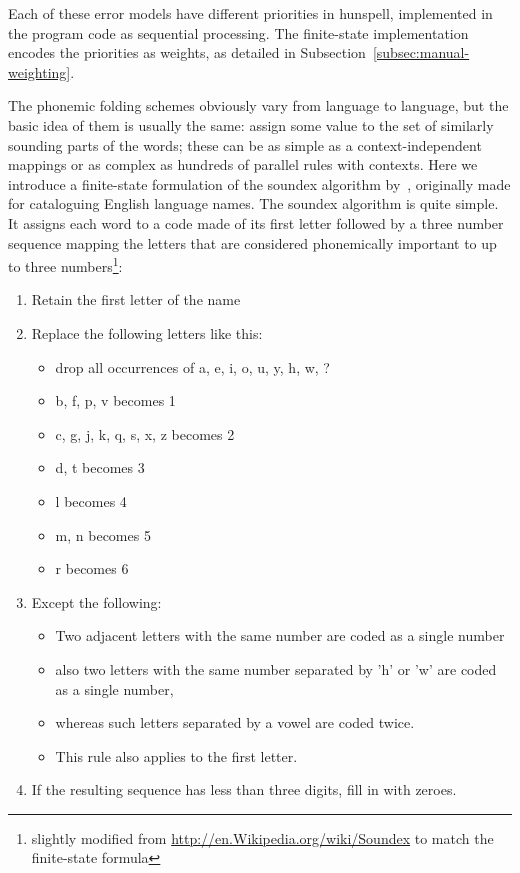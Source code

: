 \documentclass[a4paper,12pt]{article}
\begin{document}
Each of these error models have different priorities in hunspell, implemented
in the program code as sequential processing. The finite-state implementation
encodes the priorities as weights, as detailed in
Subsection~\ref{subsec:manual-weighting}.

The phonemic folding schemes obviously vary from language to language, but the
basic idea of them is usually the same: assign some value to the set of
similarly sounding parts of the words; these can be as simple as a
context-independent mappings or as complex as hundreds of parallel rules with
contexts. Here we introduce a finite-state formulation of the soundex algorithm
by~\cite{russell1918soundex}, originally made for cataloguing English language
names. The soundex algorithm is quite simple. It assigns each word to a code
made of its first letter followed by a three number sequence mapping the
letters that are considered phonemically important to up to three
numbers\footnote{slightly modified from
\url{http://en.Wikipedia.org/wiki/Soundex} to match the finite-state formula}:

\begin{enumerate}
    \item Retain the first letter of the name 
    \item Replace the following letters like this:\begin{itemize}
            \item drop all occurrences of a, e, i, o, u, y, h, w, ?
            \item b, f, p, v becomes 1
            \item c, g, j, k, q, s, x, z becomes 2
            \item d, t becomes 3
            \item l becomes 4
            \item m, n becomes 5
            \item r becomes 6
        \end{itemize}
    \item Except the following:\begin{itemize}
            \item Two adjacent letters with the same number are coded as a
                single number
            \item also two letters with the same number separated by 'h' or 'w'
                are coded as a single number,
            \item whereas such letters separated by a vowel are coded twice.
            \item This rule also applies to the first letter.
        \end{itemize}
    \item If the resulting sequence has less than three digits, fill in with
        zeroes.
\end{enumerate}
\end{document}
